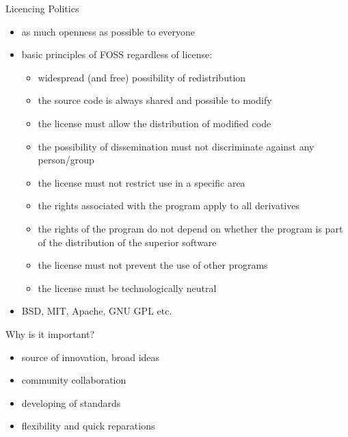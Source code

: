 \documentclass{beamer}
\begin{document}
        \begin{frame}[allowframebreaks]{Licencing Politics}
            \begin{itemize}
                \item as much openness as possible to everyone
                \item basic principles of FOSS regardless of license:
                    \begin{itemize}
                        \item widespread (and free) possibility of redistribution
                        \item the source code is always shared and possible to modify
                        \item the license must allow the distribution of modified code
                        \item the possibility of dissemination must not discriminate against any person/group
                        \item the license must not restrict use in a specific area
                        \item the rights associated with the program apply to all derivatives
                        \item the rights of the program do not depend on whether the program is part of the distribution of the superior software
                        \item the license must not prevent the use of other programs
                        \item the license must be technologically neutral
                    \end{itemize}
                \item BSD, MIT, Apache, GNU GPL etc.
            \end{itemize}
        \end{frame}

        \begin{frame}[allowframebreaks]{Why is it important?}
            \begin{itemize}
                \item source of innovation, broad ideas
                \item community collaboration
                \item developing of standards
                \item flexibility and quick reparations
            \end{itemize}
        \end{frame}
\end{document}
